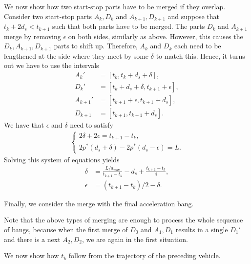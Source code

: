 \documentclass[a4paper]{article}
\theoremstyle{definition}
\theoremstyle{plain}
\begin{document}
We now show how two start-stop parts have to be merged if they overlap. Consider
two start-stop parts $A_{k},D_{k}$ and $A_{k+1},D_{k+1}$ and suppose that
$t_{k} + 2 d_{s} < t_{k+1}$ such that both parts have to be merged. The parts
$D_{k}$ and $A_{k+1}$ merge by removing $\epsilon$ on both sides, similarly as
above. However, this causes the $D_{k},A_{k+1},D_{k+1}$ parts to shift up.
Therefore, $A_{k}$ and $D_{k}$ each need to be lengthened at the side where they
meet by some $\delta$ to match this.
%
Hence, it turns out we have to use the intervals
\begin{align*}
  A_{k}' &= [t_{k}, t_{k} + d_{s} + \delta] , \\
  D_{k}' &= [t_{k} + d_{s} + \delta, t_{k+1} + \epsilon] , \\
  A_{k+1}' &= [t_{k+1} + \epsilon, t_{k+1} + d_{s} ] , \\
  D_{k+1} &= [t_{k+1}, t_{k+1} + d_{s}] .
\end{align*}
%
We have that $\epsilon$ and $\delta$ need to satisfy
\begin{align*}
  \begin{cases}
  2\delta + 2\epsilon = t_{k+1} - t_{k} , \\
  2p^{*}(d_{s}+\delta) - 2p^{*}(d_{s} - \epsilon) = L .
  \end{cases}
\end{align*}
Solving this system of equations yields
\begin{align*}
  \delta &= \frac{L / a_{\max}}{t_{k+1} - t_{k}} - d_{s} + \frac{t_{k+1} - t_{k}}{4} , \\
  \epsilon &= (t_{k+1} - t_{k}) / 2 - \delta .
\end{align*}
%

Finally, we consider the merge with the final acceleration bang.

Note that the above types of merging are enough to process the whole sequence of
bangs, because when the first merge of $D_{0}$ and $A_{1},D_{1}$ results in a
single $D_{1}'$ and there is a next $A_{2},D_{2}$, we are again in the first
situation.

We now show how $t_{k}$ follow from the trajectory of the preceding vehicle.
\end{document}
